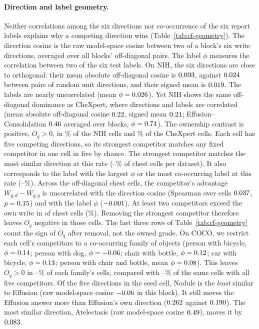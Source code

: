 \documentclass{article}
\begin{document}
\paragraph{Direction and label geometry.} Neither correlations among the six directions nor co-occurrence of the six report labels explains why a competing direction wins (Table~\ref{tab:cf-geometry}). The direction cosine is the raw model-space cosine between two of a block's six write directions, averaged over all blocks' off-diagonal pairs. The label $\phi$ measures the correlation between two of the six test labels. On NIH, the six directions are close to orthogonal: their mean absolute off-diagonal cosine is $0.093$, against $0.024$ between pairs of random unit directions, and their signed mean is $0.019$. The labels are nearly uncorrelated (mean $\phi=0.026$). Yet NIH shows the same off-diagonal dominance as CheXpert, where directions and labels are correlated (mean absolute off-diagonal cosine $0.22$, signed mean $0.21$; Effusion--Consolidation $0.46$ averaged over blocks, $\phi=0.74$). The ownership contrast is positive, $O_q>0$, in \cfGeoOwnWinsNihPct\% of the \cfNihCells{} NIH cells and \cfGeoOwnWinsChexPct\% of the \cfChexCells{} CheXpert cells. Each cell has five competing directions, so its strongest competitor matches any fixed competitor in one cell in five by chance. The strongest competitor matches the most similar direction at this rate (\cfGeoChanceCosMin{}--\cfGeoChanceCosMax\% of chest cells per dataset). It also corresponds to the label with the largest $\phi$ or the most co-occurring label at this rate (\cfGeoChanceLabelMin{}--\cfGeoChanceLabelMax\%). Across the \cfGeoOffdiagCells{} off-diagonal chest cells, the competitor's advantage $W_{q,d}-W_{q,q}$ is uncorrelated with the direction cosine (Spearman over cells $0.037$, $p=0.15$) and with the label $\phi$ ($-0.001$). At least two competitors exceed the own write in \cfGeoTwoAbove{} of \cfGeoTwoAboveN{} chest cells (\cfGeoTwoAbovePct\%). Removing the strongest competitor therefore leaves $O_q$ negative in those cells. The last three rows of Table~\ref{tab:cf-geometry} count the sign of $O_q$ after removal, not the owned grade. On COCO, we restrict each cell's competitors to a co-occurring family of objects (person with bicycle, $\phi=0.14$; person with dog, $\phi=-0.06$; chair with bottle, $\phi=0.12$; car with bicycle, $\phi=0.13$; person with chair and bottle, mean $\phi=0.08$). This leaves $O_q>0$ in \cfGeoCocoFamMinPct{}--\cfGeoCocoFamMaxPct\% of each family's cells, compared with \cfGeoCocoFamFullMinPct{}--\cfGeoCocoFamFullMaxPct\% of the same cells with all five competitors. Of the five directions in the seed cell, Nodule is the \emph{least} similar to Effusion (raw model-space cosine $-0.06$ in this block). It still moves the Effusion answer more than Effusion's own direction ($0.262$ against $0.190$). The most similar direction, Atelectasis (raw model-space cosine $0.49$), moves it by $0.083$.
\end{document}
